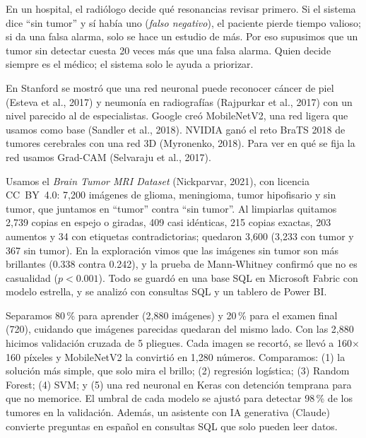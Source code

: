 \documentclass[10pt,letterpaper]{article}
\newcommand{\seccion}[1]{\par\vspace{3pt}{\small\bfseries #1}\par\vspace{0.5pt}}
\begin{document}
\seccion{1. Introducción y problema}
En un hospital, el radiólogo decide qué resonancias revisar primero. Si el sistema dice ``sin tumor'' y sí había uno (\emph{falso negativo}), el paciente pierde tiempo valioso; si da una falsa alarma, solo se hace un estudio de más. Por eso supusimos que un tumor sin detectar cuesta 20 veces más que una falsa alarma. Quien decide siempre es el médico; el sistema solo le ayuda a priorizar.

\seccion{2. Estado del arte}
En Stanford se mostró que una red neuronal puede reconocer cáncer de piel (Esteva et al., 2017) y neumonía en radiografías (Rajpurkar et al., 2017) con un nivel parecido al de especialistas. Google creó MobileNetV2, una red ligera que usamos como base (Sandler et al., 2018). NVIDIA ganó el reto BraTS 2018 de tumores cerebrales con una red 3D (Myronenko, 2018). Para ver en qué se fija la red usamos Grad-CAM (Selvaraju et al., 2017).

\seccion{3. Datos}
Usamos el \emph{Brain Tumor MRI Dataset} (Nickparvar, 2021), con licencia CC~BY~4.0: 7,200 imágenes de glioma, meningioma, tumor hipofisario y sin tumor, que juntamos en ``tumor'' contra ``sin tumor''. Al limpiarlas quitamos 2,739 copias en espejo o giradas, 409 casi idénticas, 215 copias exactas, 203 aumentos y 34 con etiquetas contradictorias; quedaron 3,600 (3,233 con tumor y 367 sin tumor). En la exploración vimos que las imágenes sin tumor son más brillantes (0.338 contra 0.242), y la prueba de Mann-Whitney confirmó que no es casualidad ($p<0.001$). Todo se guardó en una base SQL en Microsoft Fabric con modelo estrella, y se analizó con consultas SQL y un tablero de Power BI.

\seccion{4. Metodología}
Separamos 80\,\% para aprender (2,880 imágenes) y 20\,\% para el examen final (720), cuidando que imágenes parecidas quedaran del mismo lado. Con las 2,880 hicimos validación cruzada de 5 pliegues. Cada imagen se recortó, se llevó a 160$\times$160 píxeles y MobileNetV2 la convirtió en 1,280 números. Comparamos: (1) la solución más simple, que solo mira el brillo; (2) regresión logística; (3) Random Forest; (4) SVM; y (5) una red neuronal en Keras con detención temprana para que no memorice. El umbral de cada modelo se ajustó para detectar 98\,\% de los tumores en la validación. Además, un asistente con IA generativa (Claude) convierte preguntas en español en consultas SQL que solo pueden leer datos.
\end{document}
